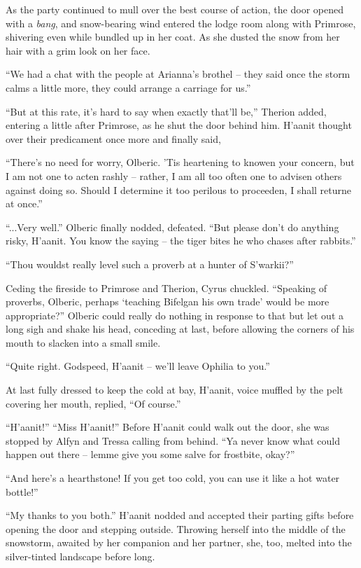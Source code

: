 As the party continued to mull over the best course of action, the door opened with a \emph{bang}, and snow-bearing wind entered the lodge room along with Primrose, shivering even while bundled up in her coat. As she dusted the snow from her hair with a grim look on her face.

``We had a chat with the people at Arianna's brothel -- they said once the storm calms a little more, they could arrange a carriage for us.''

``But at this rate, it's hard to say when exactly that'll be,'' Therion added, entering a little after Primrose, as he shut the door behind him. H'aanit thought over their predicament once more and finally said,

``There's no need for worry, Olberic. 'Tis heartening to knowen your concern, but I am not one to acten rashly -- rather, I am all too often one to advisen others against doing so. Should I determine it too perilous to proceeden, I shall returne at once.''

``...Very well.'' Olberic finally nodded, defeated. ``But please don't do anything risky, H'aanit. You know the saying -- the tiger bites he who chases after rabbits.'' 

``Thou wouldst really level such a proverb at a hunter of S'warkii?''

Ceding the fireside to Primrose and Therion, Cyrus chuckled. ``Speaking of proverbs, Olberic, perhaps `teaching Bifelgan his own trade' would be more appropriate?'' Olberic could really do nothing in response to that but let out a long sigh and shake his head, conceding at last, before allowing the corners of his mouth to slacken into a small smile.

``Quite right. Godspeed, H'aanit -- we'll leave Ophilia to you.''

At last fully dressed to keep the cold at bay, H'aanit, voice muffled by the pelt covering her mouth, replied, ``Of course.''

``H'aanit!'' ``Miss H'aanit!'' Before H'aanit could walk out the door, she was stopped by Alfyn and Tressa calling from behind. ``Ya never know what could happen out there -- lemme give you some salve for frostbite, okay?''

``And here's a hearthstone! If you get too cold, you can use it like a hot water bottle!''

``My thanks to you both.'' H'aanit nodded and accepted their parting gifts before opening the door and stepping outside. Throwing herself into the middle of the snowstorm, awaited by her companion and her partner, she, too, melted into the silver-tinted landscape before long.

